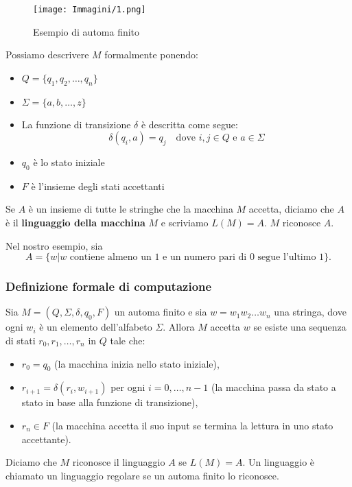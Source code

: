 \documentclass{article}
\begin{document}
\begin{figure}[ht]
    \centering
    \texttt{[image: Immagini/1.png]}
    \caption{Esempio di automa finito}
    \label{fig:automa1}
\end{figure}

Possiamo descrivere $M$ formalmente ponendo:
\begin{itemize}
    \item $Q = \{q_1, q_2, \dots, q_n\}$
    \item $\Sigma = \{a, b, \dots, z\}$
    \item La funzione di transizione $\delta$ è descritta come segue:
        \[
        \delta(q_i, a) = q_j \quad \text{dove } i, j \in Q \text{ e } a \in \Sigma
        \]
    \item $q_0$ è lo stato iniziale
    \item $F$ è l'insieme degli stati accettanti
\end{itemize}

Se $A$ è un insieme di tutte le stringhe che la macchina $M$ accetta, diciamo che $A$ è il \textbf{linguaggio della macchina} $M$ e scriviamo $L(M) = A$. $M$ riconosce $A$.


Nel nostro esempio, sia $$ A = \{ w | w \text{ contiene almeno un 1 e un numero pari di 0 segue l'ultimo 1}\}.$$

\subsubsection{Definizione formale di computazione}
Sia $M = (Q, \Sigma, \delta, q_0, F)$ un automa finito e sia $w = w_1 w_2 \dots w_n$ una stringa, dove ogni $w_i$ è un elemento dell'alfabeto $\Sigma$. Allora $M$ accetta $w$ se esiste una sequenza di stati $r_0, r_1, \dots, r_n$ in $Q$ tale che:

\begin{itemize}
    \item $r_0 = q_0$ (la macchina inizia nello stato iniziale),
    \item $r_{i+1} = \delta(r_i, w_{i+1})$ per ogni $i = 0, \dots, n-1$ (la macchina passa da stato a stato in base alla funzione di transizione),
    \item $r_n \in F$ (la macchina accetta il suo input se termina la lettura in uno stato accettante).
\end{itemize}

Diciamo che $M$ riconosce il linguaggio $A$ se $L(M) = A$. Un linguaggio è chiamato un linguaggio regolare se un automa finito lo riconosce.
\end{document}
